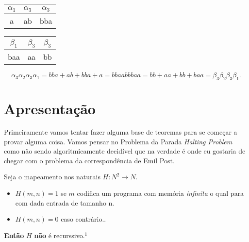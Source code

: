 \documentclass[12pt, a4paper]{article}
\begin{document}
\begin{table}[ht]
\begin{minipage}[b]{0.45\linewidth}\centering
\begin{tabular}{|c|c|c|}
\hline 
$\alpha_1$ & $\alpha_3$ & $\alpha_3$ \\ 
\hline 
a & ab & bba \\ 
\hline 
\end{tabular}
\end{minipage}
\hspace{0.5cm}
\begin{minipage}[b]{0.45\linewidth}
\centering
\begin{tabular}{|c|c|c|}
\hline 
$\beta_1$ & $\beta_3$ & $\beta_3$ \\ 
\hline 
baa & aa & bb \\ 
\hline 
\end{tabular}
\end{minipage}
$$\alpha_3 \alpha_2 \alpha_3 \alpha_1 = bba + ab + bba + a = bbaabbbaa = bb + aa + bb + baa = \beta_{3} \beta_{2} \beta_{3} \beta_{1}.$$
\end{table}

\pagebreak
\section{Apresentação}


\qquad Primeiramente vamos tentar fazer alguma base de teoremas para se começar a provar alguma coisa. Vamos pensar no Problema da Parada \textit{Halting Problem} como não sendo algoritmicamente decidível que na verdade é onde eu gostaria de chegar com o problema da correspondência de Emil Post.

\quad Seja o mapeamento nos naturais $H: N^2 \rightarrow N$.

\begin{itemize}
\item $H \left({m, n}\right) = 1$ se $m$ codifica um programa com memória \textit{infinita} o qual para com dada entrada de tamanho n.
\item$H \left({m, n}\right) = 0$ caso contrário..
\end{itemize}

\quad \textbf{Então} $H$ \textbf{não} é recurssivo.\href{http://www.proofwiki.org/wiki/Halting_Problem_is_Not_Algorithmically_Decidable}{$^1$}
\end{document}
